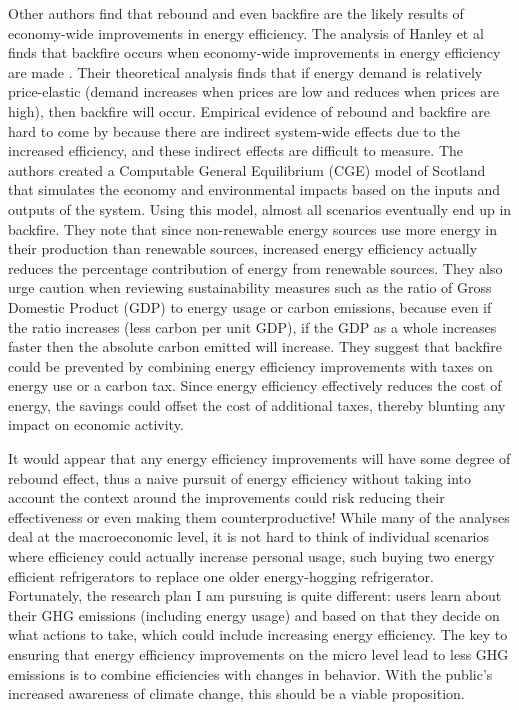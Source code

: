 Other authors find that rebound and even backfire are the likely results of economy-wide improvements in energy efficiency. The analysis of Hanley et al finds that backfire occurs when economy-wide improvements in energy efficiency are made \cite{Hanley2008Do-increases-in}. Their theoretical analysis finds that if energy demand is relatively price-elastic (demand increases when prices are low and reduces when prices are high), then backfire will occur. Empirical evidence of rebound and backfire are hard to come by because there are indirect system-wide effects due to the increased efficiency, and these indirect effects are difficult to measure. The authors created a Computable General Equilibrium (CGE) model of Scotland that simulates the economy and environmental impacts based on the inputs and outputs of the system. Using this model, almost all scenarios eventually end up in backfire. They note that since non-renewable energy sources use more energy in their production than renewable sources, increased energy efficiency actually reduces the percentage contribution of energy from renewable sources. They also urge caution when reviewing sustainability measures such as the ratio of Gross Domestic Product (GDP) to energy usage or carbon emissions, because even if the ratio increases (less carbon per unit GDP), if the GDP as a whole increases faster then the absolute carbon emitted will increase. They suggest that backfire could be prevented by combining energy efficiency improvements with taxes on energy use or a carbon tax. Since energy efficiency effectively reduces the cost of energy, the savings could offset the cost of additional taxes, thereby blunting any impact on economic activity.

It would appear that any energy efficiency improvements will have some degree of rebound effect, thus a naive pursuit of energy efficiency without taking into account the context around the improvements could risk reducing their effectiveness or even making them counterproductive! While many of the analyses deal at the macroeconomic level, it is not hard to think of individual scenarios where efficiency could actually increase personal usage, such buying two energy efficient refrigerators to replace one older energy-hogging refrigerator. Fortunately, the research plan I am pursuing is quite different: users learn about their GHG emissions (including energy usage) and based on that they decide on what actions to take, which could include increasing energy efficiency. The key to ensuring that energy efficiency improvements on the micro level lead to less GHG emissions is to combine efficiencies with changes in behavior. With the public's increased awareness of climate change, this should be a viable proposition.

